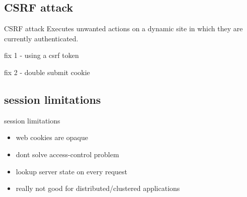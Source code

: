 \documentclass[9pt]{beamer}
\begin{document}

\subsection{CSRF attack}
\begin{frame}{CSRF attack}
  Executes unwanted actions on a dynamic site in which they are currently authenticated.
\end{frame}


\begin{frame}{fix 1 - using a csrf token}
\end{frame}


\begin{frame}{fix 2 - double submit cookie}
\end{frame}


\subsection{session limitations}
\begin{frame}{session limitations}
  \begin{itemize}
  \item web cookies are opaque
    \pause
  \item dont solve access-control problem    
    \pause
  \item lookup server state on every request
    \pause
  \item really not good for distributed/clustered applications
  \end{itemize}
\end{frame}
\end{document}
